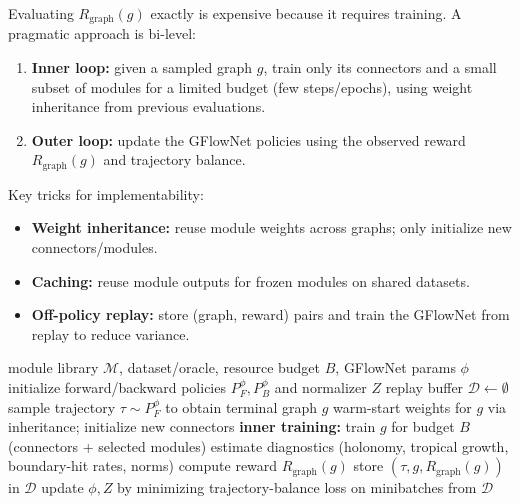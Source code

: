 \documentclass[11pt]{article}
\theoremstyle{definition}
\theoremstyle{plain}
\theoremstyle{remark}
\newcommand{\mc}[1]{\mathcal{#1}}
\begin{document}
Evaluating $R_{\mathrm{graph}}(g)$ exactly is expensive because it requires training.
A pragmatic approach is bi-level:
\begin{enumerate}[leftmargin=2em]
\item \textbf{Inner loop:} given a sampled graph $g$, train only its connectors and a small subset of modules for a limited budget (few steps/epochs), using weight inheritance from previous evaluations.
\item \textbf{Outer loop:} update the GFlowNet policies using the observed reward $R_{\mathrm{graph}}(g)$ and trajectory balance.
\end{enumerate}

Key tricks for implementability:
\begin{itemize}[leftmargin=2em]
\item \textbf{Weight inheritance:} reuse module weights across graphs; only initialize new connectors/modules.
\item \textbf{Caching:} reuse module outputs for frozen modules on shared datasets.
\item \textbf{Off-policy replay:} store (graph, reward) pairs and train the GFlowNet from replay to reduce variance.
\end{itemize}

\begin{algorithm}[t]
\caption{Continuous GFlowNet search over decorated quivers (bi-level)}
\label{alg:gflownet}
\begin{algorithmic}[1]
\Require module library $\mc{M}$, dataset/oracle, resource budget $B$, GFlowNet params $\phi$
\State initialize forward/backward policies $P_F^\phi,P_B^\phi$ and normalizer $Z$
\State replay buffer $\mc{D}\gets\emptyset$
  \State sample trajectory $\tau\sim P_F^\phi$ to obtain terminal graph $g$
  \State warm-start weights for $g$ via inheritance; initialize new connectors
  \State \textbf{inner training:} train $g$ for budget $B$ (connectors + selected modules)
  \State estimate diagnostics (holonomy, tropical growth, boundary-hit rates, norms)
  \State compute reward $R_{\mathrm{graph}}(g)$
  \State store $(\tau,g,R_{\mathrm{graph}}(g))$ in $\mc{D}$
  \State update $\phi,Z$ by minimizing trajectory-balance loss on minibatches from $\mc{D}$
\EndFor
\end{algorithmic}
\end{algorithm}
\end{document}
